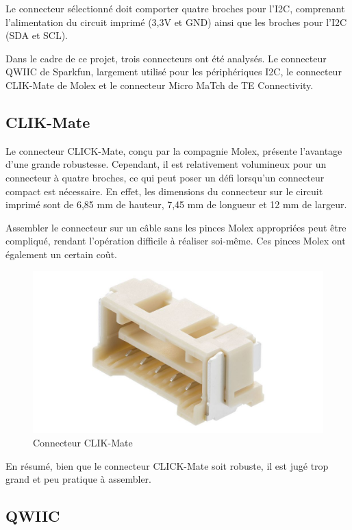 Le connecteur sélectionné doit comporter quatre broches pour l'I2C, comprenant l'alimentation du circuit imprimé (3,3V et GND) ainsi que les broches pour l'I2C (SDA et SCL).

Dans le cadre de ce projet, trois connecteurs ont été analysés.
Le connecteur QWIIC de Sparkfun, largement utilisé pour les périphériques I2C, le connecteur CLIK-Mate de Molex et le connecteur Micro MaTch de TE Connectivity.

\subsection{CLIK-Mate}

Le connecteur CLICK-Mate, conçu par la compagnie Molex, présente l'avantage d'une grande robustesse.
Cependant, il est relativement volumineux pour un connecteur à quatre broches, ce qui peut poser un défi lorsqu'un connecteur compact est nécessaire.
En effet, les dimensions du connecteur sur le circuit imprimé sont de 6,85 mm de hauteur, 7,45 mm de longueur et 12 mm de largeur.

Assembler le connecteur sur un câble sans les pinces Molex appropriées peut être compliqué, rendant l'opération difficile à réaliser soi-même. Ces pinces Molex ont également un certain coût.

\begin{figure}[H]
    \centering
    \includegraphics[scale=0.085]{./assets/figures/clik_mate.jpg}
    \caption{\cite{clikmate} Connecteur CLIK-Mate}
\end{figure}

En résumé, bien que le connecteur CLICK-Mate soit robuste, il est jugé trop grand et peu pratique à assembler.

\subsection{QWIIC}


